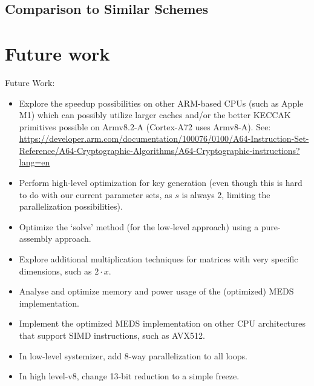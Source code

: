 \documentclass[11pt,a4paper]{report}
\theoremstyle{definition}
\begin{document}
\section{Comparison to Similar Schemes}

\chapter{Future work}
\label{ch:futurework}
Future Work:
\begin{itemize}
  \item Explore the speedup possibilities on other ARM-based CPUs (such as Apple M1) which can possibly utilize larger caches and/or the better KECCAK primitives possible on Armv8.2-A (Cortex-A72 uses Armv8-A). See: \url{https://developer.arm.com/documentation/100076/0100/A64-Instruction-Set-Reference/A64-Cryptographic-Algorithms/A64-Cryptographic-instructions?lang=en}
  \item Perform high-level optimization for key generation (even though this is hard to do with our current parameter sets, as $s$ is always 2, limiting the parallelization possibilities).
  \item Optimize the `solve' method (for the low-level approach) using a pure-assembly approach.
  \item Explore additional multiplication techniques for matrices with very specific dimensions, such as $2 \cdot x$.
  \item Analyse and optimize memory and power usage of the (optimized) MEDS implementation.
  \item Implement the optimized MEDS implementation on other CPU architectures that support SIMD instructions, such as AVX512.
  \item In low-level systemizer, add 8-way parallelization to all loops.
  \item In high level-v8, change 13-bit reduction to a simple freeze.
\end{itemize}
\end{document}
